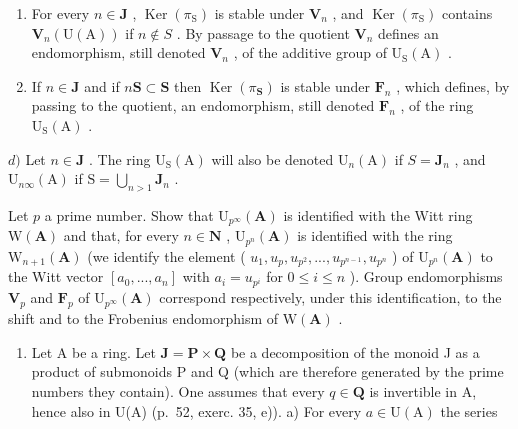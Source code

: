 \begin{enumerate}
\def\labelenumi{\alph{enumi})}
\setcounter{enumi}{1}
\item
  For every \(n \in \mathbf{J}\) , \(\operatorname{Ker}(\pi_{\mathrm{S}})\) is stable under \(\mathbf{V}_{n}\) , and \(\operatorname{Ker}(\pi_{\mathrm{S}})\) contains \(\mathbf{V}_{n}(\mathrm{U}(\mathrm{A}))\) if \(n \notin S\) . By passage to the quotient \(\mathbf{V}_{n}\) defines an endomorphism, still denoted \(\mathbf{V}_{n}\) , of the additive group of \(\mathrm{U}_{\mathrm{S}}(\mathrm{A})\) .
\item
  If \(n \in \mathbf{J}\) and if \(n\mathbf{S} \subset \mathbf{S}\) then \(\operatorname{Ker}(\pi_{\mathbf{S}})\) is stable under \(\mathbf{F}_{n}\) , which defines, by passing to the quotient, an endomorphism, still denoted \(\mathbf{F}_{n}\) , of the ring \(\mathrm{U}_{\mathrm{S}}(\mathrm{A})\) .
\end{enumerate}

\(d)\) Let \(n \in \mathbf{J}\) . The ring \(\mathrm{U}_{\mathrm{S}}(\mathrm{A})\) will also be denoted \(\mathrm{U}_{n}(\mathrm{A})\) if \(S = \mathbf{J}_{n}\) , and \(\mathrm{U}_{n\infty}(\mathrm{A})\) if \(\mathrm{S} = \bigcup_{n > 1} \mathbf{J}_{n}\) .

Let \(p\) a prime number. Show that \(\mathrm{U}_{p^{\infty}}(\mathbf{A})\) is identified with the Witt ring \(\mathrm{W}(\mathbf{A})\) and that, for every \(n \in \mathbf{N}\) , \(\mathrm{U}_{p^n}(\mathbf{A})\) is identified with the ring \(\mathrm{W}_{n+1}(\mathbf{A})\) (we identify the element ( \(u_1, u_p, u_{p^2}, ..., u_{p^{n-1}}, u_{p^n}\) ) of \(\mathrm{U}_{p^n}(\mathbf{A})\) to the Witt vector \([a_0, ..., a_n]\) with \(a_i = u_{p^i}\) for \(0 \leqslant i \leqslant n\) ). Group endomorphisms \(\mathbf{V}_p\) and \(\mathbf{F}_p\) of \(\mathrm{U}_{p^\infty}(\mathbf{A})\) correspond respectively, under this identification, to the shift and to the Frobenius endomorphism of \(\mathrm{W}(\mathbf{A})\) .

\begin{enumerate}
\def\labelenumi{\arabic{enumi})}
\setcounter{enumi}{39}
\tightlist
\item
  Let A be a ring. Let \(\mathbf{J} = \mathbf{P} \times \mathbf{Q}\) be a decomposition of the monoid J as a product of submonoids P and Q (which are therefore generated by the prime numbers they contain). One assumes that every \(q \in \mathbf{Q}\) is invertible in A, hence also in U(A) (p.~52, exerc. 35, e)). a) For every \(a \in \mathrm{U(A)}\) the series
\end{enumerate}

